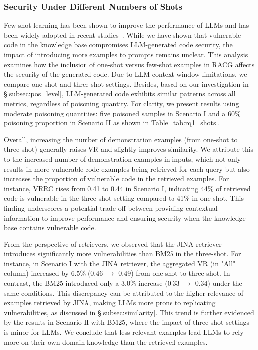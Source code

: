 \subsubsection{Security Under Different Numbers of Shots}
Few-shot learning has been shown to improve the performance of LLMs and has been widely adopted in recent studies~\cite{song2023comprehensive,wang2020generalizing}. While we have shown that vulnerable code in the knowledge base compromises LLM-generated code security, the impact of introducing more examples to prompts remains unclear. This analysis examines how the inclusion of one-shot versus few-shot examples in RACG affects the security of the generated code. Due to LLM context window limitations, we compare one-shot and three-shot settings. Besides, based on our investigation in \S\ref{subsec:pos_level}, LLM-generated code exhibits similar patterns across all metrics, regardless of poisoning quantity. For clarity, we present results using moderate poisoning quantities: five poisoned samples in Scenario I and a 60\% poisoning proportion in Scenario II as shown in Table~\ref{tab:rq1_shots}.


Overall, increasing the number of demonstration examples (from one-shot to three-shot) generally raises VR and slightly improves similarity. We attribute this to the increased number of demonstration examples in inputs, which not only results in more vulnerable code examples being retrieved for each query but also increases the proportion of vulnerable code in the retrieved examples. For instance, VRRC rises from 0.41 to 0.44 in Scenario I, indicating 44\% of retrieved code is vulnerable in the three-shot setting compared to 41\% in one-shot. This finding underscores a potential trade-off between providing contextual information to improve performance and ensuring security when the knowledge base contains vulnerable code.

From the perspective of retrievers, we observed that the JINA retriever introduces significantly more vulnerabilities than BM25 in the three-shot. For instance, in Scenario I with the JINA retriever, the aggregated VR (\ie in "All" column) increased by 6.5\% (0.46 $\rightarrow$ 0.49) from one-shot to three-shot. In contrast, the BM25 introduced only a 3.0\% increase (0.33 $\rightarrow$ 0.34) under the same conditions. This discrepancy can be attributed to the higher relevance of examples retrieved by JINA, making LLMs more prone to replicating vulnerabilities, as discussed in \S\ref{subsec:similarity}.
This trend is further evidenced by the results in Scenario II with BM25, where the impact of three-shot settings is minor for LLMs. We conclude that less relevant examples lead LLMs to rely more on their own domain knowledge than the retrieved examples.

